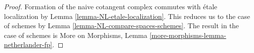 \documentclass[10pt,a4paper]{amsart}
\theoremstyle{plain}
\theoremstyle{definition}
\theoremstyle{remark}
\numberwithin{equation}{subsection}
\begin{document}
\begin{proof}
Formation of the naive cotangent complex commutes with \'etale
localization by Lemma \ref{lemma-NL-etale-localization}.
This reduces us to the case of schemes by
Lemma \ref{lemma-NL-compare-spaces-schemes}.
The result in the case of schemes is
More on Morphisms, Lemma
\ref{more-morphisms-lemma-netherlander-fp}.
\end{proof}
\end{document}
